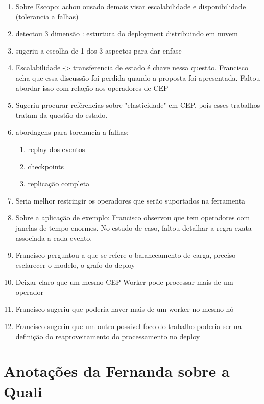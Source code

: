 \begin{enumerate}
\item Sobre Escopo: achou ousado demais visar escalabilidade e disponibilidade (tolerancia a falhas)
\item detectou 3 dimensão : esturtura do deployment distribuindo em nuvem
\item sugeriu a escolha de 1 dos 3 aspectos para dar enfase
\item Escalabilidade -> transferencia de estado é chave nessa questão. Francisco acha que essa discussão foi perdida quando a proposta foi apresentada. Faltou abordar isso com relação aos operadores de CEP
\item Sugeriu procurar refêrencias sobre "elasticidade" em CEP, pois esses trabalhos tratam da questão do estado.
\item abordagens para torelancia a falhas: 
\begin{enumerate}
\item replay dos eventos
\item checkpoints
\item replicação completa
\end{enumerate}
\item Seria melhor restringir os operadores que serão suportados na ferramenta
\item Sobre a aplicação de exemplo: Francisco observou que tem operadores com janelas de tempo enormes. No estudo de caso, faltou detalhar a regra exata associada a cada evento.
\item Francisco perguntou a que se refere o balanceamento de carga, preciso esclarecer o modelo, o grafo do deploy
\item Deixar claro que um mesmo CEP-Worker pode processar mais de um operador
\item Francisco sugeriu que poderia haver mais de um worker no mesmo nó
\item Francisco sugeriu que um outro possivel foco do trabalho poderia ser na definição do reaproveitamento do processamento no deploy
\end{enumerate}










\section{Anotações da Fernanda sobre a Quali}
